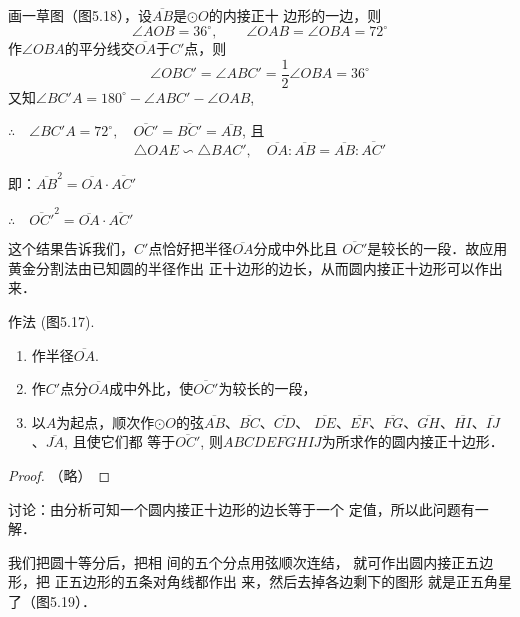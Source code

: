 \begin{analyze}
    画一草图（图5.18），设$\overline{AB}$是$\odot O$的内接正十
边形的一边，则
\[\angle AOB=36^{\circ},\qquad \angle OAB=\angle OBA=72^{\circ}\]
作$\angle OBA$的平分线交$\overline{OA}$于$C'$点，则
\[\angle OBC'=\angle ABC'=\frac{1}{2}\angle OBA=36^{\circ}\]
又知$\angle BC'A=180^{\circ}-\angle ABC'-\angle OAB$,

$\therefore\quad \angle BC'A=72^{\circ},\quad 
\overline{OC'}=\overline{BC'}=\overline{AB}$, 且
$$\triangle OAE\backsim \triangle BAC',\quad \overline{OA}:\overline{AB}=\overline{AB}:\overline{AC'}$$

即：$\overline{AB}^2=\overline{OA}\cdot \overline{AC'}$

$\therefore\quad \overline{OC'}^2=\overline{OA}\cdot \overline{AC'}$
\end{analyze}

这个结果告诉我们，$C'$点恰好把半径$\overline{OA}$分成中外比且
$\overline{OC'}$是较长的一段．故应用黄金分割法由已知圆的半径作出
正十边形的边长，从而圆内接正十边形可以作出来．

作法 (图5.17).
\begin{enumerate}
\item 作半径$\overline{OA}$.
\item 作$C'$点分$\overline{OA}$成中外比，使$\overline{OC'}$为较长的一段，
\item 以$A$为起点，顺次作$\odot O$的弦$\overline{AB}$、$\overline{BC}$、$\overline{CD}$、
$\overline{DE}$、$\overline{EF}$、$\overline{FG}$、$\overline{GH}$、$\overline{HI}$、$\overline{IJ}$、$\overline{JA}$, 且使它们都
等于$\overline{OC'}$, 则$ABCDEFGHIJ$为所求作的圆内接正十边形．
\end{enumerate}



\begin{proof}
    （略）
\end{proof}

讨论：由分析可知一个圆内接正十边形的边长等于一个
定值，所以此问题有一解．

我们把圆十等分后，把相
间的五个分点用弦顺次连结，
就可作出圆内接正五边形，把
正五边形的五条对角线都作出
来，然后去掉各边剩下的图形
就是正五角星了（图5.19）．


